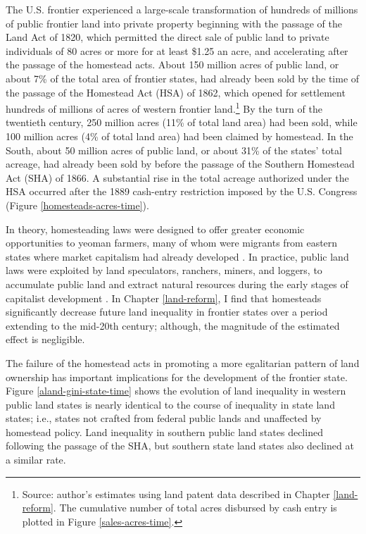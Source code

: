 The U.S. frontier experienced a large-scale transformation of hundreds of millions of public frontier land into private property beginning with the passage of the Land Act of 1820, which permitted the direct sale of public land to private individuals of 80 acres or more for at least \$1.25 an acre, and accelerating after the passage of the homestead acts. About 150 million acres of public land, or about 7\% of the total area of frontier states, had already been sold by the time of the passage of the Homestead Act (HSA) of 1862, which opened for settlement hundreds of millions of acres of western frontier land.\footnote{Source: author's estimates using land patent data described in Chapter \ref{land-reform}. The cumulative number of total acres disbursed by cash entry is plotted in Figure \ref{sales-acres-time}.} By the turn of the twentieth century, 250 million acres (11\% of total land area) had been sold, while 100 million acres (4\% of total land area) had been claimed by homestead. In the South, about 50 million acres of public land, or about 31\% of the states' total acreage, had already been sold by before the passage of the Southern Homestead Act (SHA) of 1866. A substantial rise in the total acreage authorized under the HSA occurred after the 1889 cash-entry restriction imposed by the U.S. Congress (Figure \ref{homesteads-acres-time}).

In theory, homesteading laws were designed to offer greater economic opportunities to yeoman farmers, many of whom were migrants from eastern states where market capitalism had already developed \citep{kulikoff1992agrarian}. In practice, public land laws were exploited by land speculators, ranchers, miners, and loggers, to accumulate public land and extract natural resources during the early stages of capitalist development \citep{murtazashvili2013political}. In Chapter \ref{land-reform}, I find that homesteads significantly decrease future land inequality in frontier states over a period extending to the mid-20th century; although, the magnitude of the estimated effect is negligible.

The failure of the homestead acts in promoting a more egalitarian pattern of land ownership has important implications for the development of the frontier state. Figure \ref{aland-gini-state-time} shows the evolution of land inequality in western public land states is nearly identical to the course of inequality in state land states; i.e., states not crafted from federal public lands and unaffected by homestead policy. Land inequality in southern public land states declined following the passage of the SHA, but southern state land states also declined at a similar rate. 

